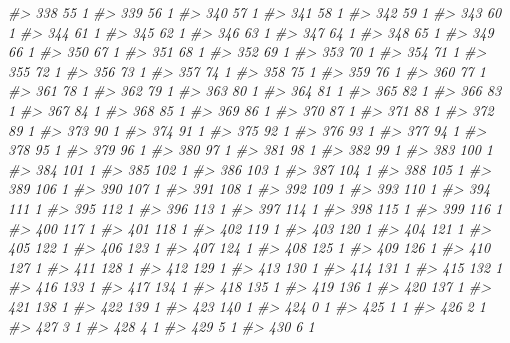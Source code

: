 \documentclass[]{article}
\newenvironment{Shaded}{\begin{snugshade}}{\end{snugshade}}
\newcommand{\CommentTok}[1]{\textcolor[rgb]{0.56,0.35,0.01}{\textit{#1}}}
\begin{document}
\begin{Shaded}
\begin{Highlighting}[]
\CommentTok{#> 338   55  1}
\CommentTok{#> 339   56  1}
\CommentTok{#> 340   57  1}
\CommentTok{#> 341   58  1}
\CommentTok{#> 342   59  1}
\CommentTok{#> 343   60  1}
\CommentTok{#> 344   61  1}
\CommentTok{#> 345   62  1}
\CommentTok{#> 346   63  1}
\CommentTok{#> 347   64  1}
\CommentTok{#> 348   65  1}
\CommentTok{#> 349   66  1}
\CommentTok{#> 350   67  1}
\CommentTok{#> 351   68  1}
\CommentTok{#> 352   69  1}
\CommentTok{#> 353   70  1}
\CommentTok{#> 354   71  1}
\CommentTok{#> 355   72  1}
\CommentTok{#> 356   73  1}
\CommentTok{#> 357   74  1}
\CommentTok{#> 358   75  1}
\CommentTok{#> 359   76  1}
\CommentTok{#> 360   77  1}
\CommentTok{#> 361   78  1}
\CommentTok{#> 362   79  1}
\CommentTok{#> 363   80  1}
\CommentTok{#> 364   81  1}
\CommentTok{#> 365   82  1}
\CommentTok{#> 366   83  1}
\CommentTok{#> 367   84  1}
\CommentTok{#> 368   85  1}
\CommentTok{#> 369   86  1}
\CommentTok{#> 370   87  1}
\CommentTok{#> 371   88  1}
\CommentTok{#> 372   89  1}
\CommentTok{#> 373   90  1}
\CommentTok{#> 374   91  1}
\CommentTok{#> 375   92  1}
\CommentTok{#> 376   93  1}
\CommentTok{#> 377   94  1}
\CommentTok{#> 378   95  1}
\CommentTok{#> 379   96  1}
\CommentTok{#> 380   97  1}
\CommentTok{#> 381   98  1}
\CommentTok{#> 382   99  1}
\CommentTok{#> 383  100  1}
\CommentTok{#> 384  101  1}
\CommentTok{#> 385  102  1}
\CommentTok{#> 386  103  1}
\CommentTok{#> 387  104  1}
\CommentTok{#> 388  105  1}
\CommentTok{#> 389  106  1}
\CommentTok{#> 390  107  1}
\CommentTok{#> 391  108  1}
\CommentTok{#> 392  109  1}
\CommentTok{#> 393  110  1}
\CommentTok{#> 394  111  1}
\CommentTok{#> 395  112  1}
\CommentTok{#> 396  113  1}
\CommentTok{#> 397  114  1}
\CommentTok{#> 398  115  1}
\CommentTok{#> 399  116  1}
\CommentTok{#> 400  117  1}
\CommentTok{#> 401  118  1}
\CommentTok{#> 402  119  1}
\CommentTok{#> 403  120  1}
\CommentTok{#> 404  121  1}
\CommentTok{#> 405  122  1}
\CommentTok{#> 406  123  1}
\CommentTok{#> 407  124  1}
\CommentTok{#> 408  125  1}
\CommentTok{#> 409  126  1}
\CommentTok{#> 410  127  1}
\CommentTok{#> 411  128  1}
\CommentTok{#> 412  129  1}
\CommentTok{#> 413  130  1}
\CommentTok{#> 414  131  1}
\CommentTok{#> 415  132  1}
\CommentTok{#> 416  133  1}
\CommentTok{#> 417  134  1}
\CommentTok{#> 418  135  1}
\CommentTok{#> 419  136  1}
\CommentTok{#> 420  137  1}
\CommentTok{#> 421  138  1}
\CommentTok{#> 422  139  1}
\CommentTok{#> 423  140  1}
\CommentTok{#> 424    0  1}
\CommentTok{#> 425    1  1}
\CommentTok{#> 426    2  1}
\CommentTok{#> 427    3  1}
\CommentTok{#> 428    4  1}
\CommentTok{#> 429    5  1}
\CommentTok{#> 430    6  1}

\end{Highlighting}
\end{Shaded}
\end{document}

